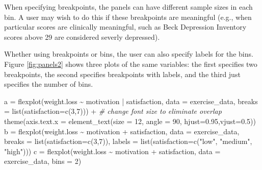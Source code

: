 \documentclass[
  english,
  man]{apa6}
\newenvironment{Shaded}{\begin{snugshade}}{\end{snugshade}}
\newcommand{\AttributeTok}[1]{\textcolor[rgb]{0.77,0.63,0.00}{#1}}
\newcommand{\CommentTok}[1]{\textcolor[rgb]{0.56,0.35,0.01}{\textit{#1}}}
\newcommand{\DecValTok}[1]{\textcolor[rgb]{0.00,0.00,0.81}{#1}}
\newcommand{\FloatTok}[1]{\textcolor[rgb]{0.00,0.00,0.81}{#1}}
\newcommand{\FunctionTok}[1]{\textcolor[rgb]{0.00,0.00,0.00}{#1}}
\newcommand{\NormalTok}[1]{#1}
\newcommand{\OtherTok}[1]{\textcolor[rgb]{0.56,0.35,0.01}{#1}}
\newcommand{\SpecialCharTok}[1]{\textcolor[rgb]{0.00,0.00,0.00}{#1}}
\newcommand{\StringTok}[1]{\textcolor[rgb]{0.31,0.60,0.02}{#1}}
\begin{document}
When specifying breakpoints, the panels can have different sample sizes in each bin. A user may wish to do this if these breakpoints are meaningful (e.g., when particular scores are clinically meaningful, such as Beck Depression Inventory scores above 29 are considered severly depressed).

Whether using breakpoints or bins, the user can also specify labels for the bins. Figure \ref{fig:panels2} shows three plots of the same variables: the first specifies two breakpoints, the second specifies breakpoints with labels, and the third just specifies the number of bins.

\small

\begin{Shaded}
\begin{Highlighting}[]
\NormalTok{a }\OtherTok{=} \FunctionTok{flexplot}\NormalTok{(weight.loss }\SpecialCharTok{\textasciitilde{}}\NormalTok{ motivation }\SpecialCharTok{|}\NormalTok{ satisfaction, }
             \AttributeTok{data =}\NormalTok{ exercise\_data, }
             \AttributeTok{breaks =} \FunctionTok{list}\NormalTok{(}\AttributeTok{satisfaction=}\FunctionTok{c}\NormalTok{(}\DecValTok{3}\NormalTok{,}\DecValTok{7}\NormalTok{)))  }\SpecialCharTok{+}
  \CommentTok{\# change font size to eliminate overlap}
    \FunctionTok{theme}\NormalTok{(}\AttributeTok{axis.text.x =} 
            \FunctionTok{element\_text}\NormalTok{(}\AttributeTok{size =} \DecValTok{12}\NormalTok{, }\AttributeTok{angle =} \DecValTok{90}\NormalTok{, }\AttributeTok{hjust=}\FloatTok{0.95}\NormalTok{,}\AttributeTok{vjust=}\FloatTok{0.5}\NormalTok{))}
\NormalTok{b }\OtherTok{=} \FunctionTok{flexplot}\NormalTok{(weight.loss }\SpecialCharTok{\textasciitilde{}}\NormalTok{ motivation }\SpecialCharTok{+}\NormalTok{ satisfaction, }
             \AttributeTok{data =}\NormalTok{ exercise\_data, }
             \AttributeTok{breaks =} \FunctionTok{list}\NormalTok{(}\AttributeTok{satisfaction=}\FunctionTok{c}\NormalTok{(}\DecValTok{3}\NormalTok{,}\DecValTok{7}\NormalTok{)), }
             \AttributeTok{labels =} \FunctionTok{list}\NormalTok{(}\AttributeTok{satisfaction=}\FunctionTok{c}\NormalTok{(}\StringTok{"low"}\NormalTok{, }\StringTok{"medium"}\NormalTok{, }\StringTok{"high"}\NormalTok{)))}
\NormalTok{c }\OtherTok{=} \FunctionTok{flexplot}\NormalTok{(weight.loss }\SpecialCharTok{\textasciitilde{}}\NormalTok{ motivation }\SpecialCharTok{+}\NormalTok{ satisfaction, }
             \AttributeTok{data =}\NormalTok{ exercise\_data, }
             \AttributeTok{bins =} \DecValTok{2}\NormalTok{) }
\end{Highlighting}
\end{Shaded}
\end{document}
